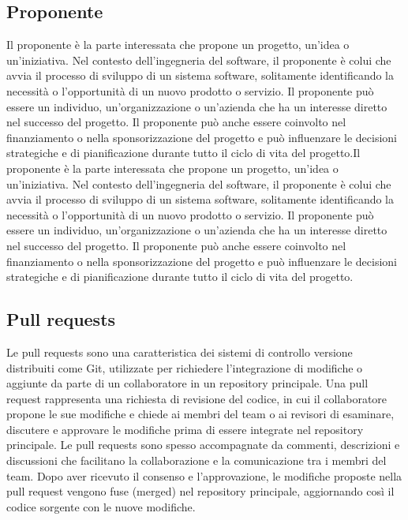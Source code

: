 \vspace{2em}
\subsection*{Proponente}
Il proponente è la parte interessata che propone un progetto, un'idea o un'iniziativa. Nel contesto dell'ingegneria del software, il proponente è colui che avvia il processo di sviluppo di un sistema software, solitamente identificando la necessità o l'opportunità di un nuovo prodotto o servizio. Il proponente può essere un individuo, un'organizzazione o un'azienda che ha un interesse diretto nel successo del progetto. Il proponente può anche essere coinvolto nel finanziamento o nella sponsorizzazione del progetto e può influenzare le decisioni strategiche e di pianificazione durante tutto il ciclo di vita del progetto.Il proponente è la parte interessata che propone un progetto, un'idea o un'iniziativa. Nel contesto dell'ingegneria del software, il proponente è colui che avvia il processo di sviluppo di un sistema software, solitamente identificando la necessità o l'opportunità di un nuovo prodotto o servizio. Il proponente può essere un individuo, un'organizzazione o un'azienda che ha un interesse diretto nel successo del progetto. Il proponente può anche essere coinvolto nel finanziamento o nella sponsorizzazione del progetto e può influenzare le decisioni strategiche e di pianificazione durante tutto il ciclo di vita del progetto.


\vspace{2em}
\subsection*{Pull requests}
Le pull requests sono una caratteristica dei sistemi di controllo versione distribuiti come Git, utilizzate per richiedere l'integrazione di modifiche o aggiunte da parte di un collaboratore in un repository principale. Una pull request rappresenta una richiesta di revisione del codice, in cui il collaboratore propone le sue modifiche e chiede ai membri del team o ai revisori di esaminare, discutere e approvare le modifiche prima di essere integrate nel repository principale. Le pull requests sono spesso accompagnate da commenti, descrizioni e discussioni che facilitano la collaborazione e la comunicazione tra i membri del team. Dopo aver ricevuto il consenso e l'approvazione, le modifiche proposte nella pull request vengono fuse (merged) nel repository principale, aggiornando così il codice sorgente con le nuove modifiche.

